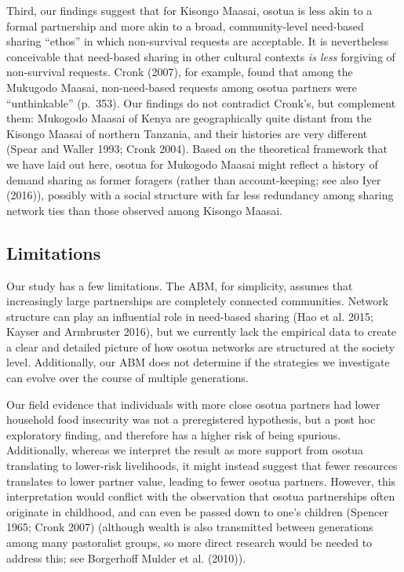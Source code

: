 \documentclass[
]{article}
\begin{document}
Third, our findings suggest that for Kisongo Maasai, osotua is less akin to a formal partnership and more akin to a broad, community-level need-based sharing ``ethos'' in which non-survival requests are acceptable. It is nevertheless conceivable that need-based sharing in other cultural contexts \emph{is less} forgiving of non-survival requests. Cronk (2007), for example, found that among the Mukugodo Maasai, non-need-based requests among osotua partners were ``unthinkable'' (p.~353). Our findings do not contradict Cronk's, but complement them: Mukogodo Maasai of Kenya are geographically quite distant from the Kisongo Maasai of northern Tanzania, and their histories are very different (Spear and Waller 1993; Cronk 2004). Based on the theoretical framework that we have laid out here, osotua for Mukogodo Maasai might reflect a history of demand sharing as former foragers (rather than account-keeping; see also Iyer (2016)), possibly with a social structure with far less redundancy among sharing network ties than those observed among Kisongo Maasai.

\subsection{Limitations}

Our study has a few limitations. The ABM, for simplicity, assumes that increasingly large partnerships are completely connected communities. Network structure can play an influential role in need-based sharing (Hao et al. 2015; Kayser and Armbruster 2016), but we currently lack the empirical data to create a clear and detailed picture of how osotua networks are structured at the society level. Additionally, our ABM does not determine if the strategies we investigate can evolve over the course of multiple generations.

Our field evidence that individuals with more close osotua partners had lower household food insecurity was not a preregistered hypothesis, but a post hoc exploratory finding, and therefore has a higher risk of being spurious. Additionally, whereas we interpret the result as more support from osotua translating to lower-risk livelihoods, it might instead suggest that fewer resources translates to lower partner value, leading to fewer osotua partners. However, this interpretation would conflict with the observation that osotua partnerships often originate in childhood, and can even be passed down to one's children (Spencer 1965; Cronk 2007) (although wealth is also transmitted between generations among many pastoralist groups, so more direct research would be needed to address this; see Borgerhoff Mulder et al. (2010)).
\end{document}
